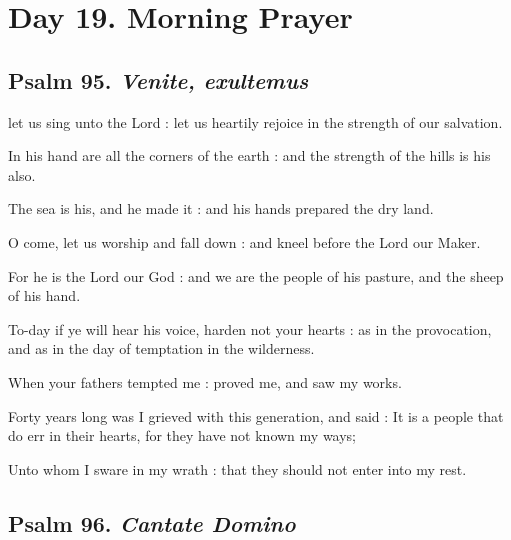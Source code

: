 \section*{Day 19. Morning Prayer}

\subsection{Psalm 95. \textit{Venite, exultemus}}

 let us sing unto the Lord : let us heartily rejoice in the strength of our salvation.\par
{}
In his hand are all the corners of the earth : and the strength of the hills is his also.\par
{}The sea is his, and he made it : and his hands prepared the dry land.\par
{}O come, let us worship and fall down : and kneel before the Lord our Maker.\par
{}For he is the Lord our God : and we are the people of his pasture, and the sheep of his hand.\par
{}To-day if ye will hear his voice, harden not your hearts : as in the provocation, and as in the day of temptation in the wilderness.\par
{}When your fathers tempted me : proved me, and saw my works.\par
{}Forty years long was I grieved with this generation, and said : It is a people that do err in their hearts, for they have not known my ways;\par
{}Unto whom I sware in my wrath : that they should not enter into my rest.\par

\subsection{Psalm 96. \textit{Cantate Domino}}

